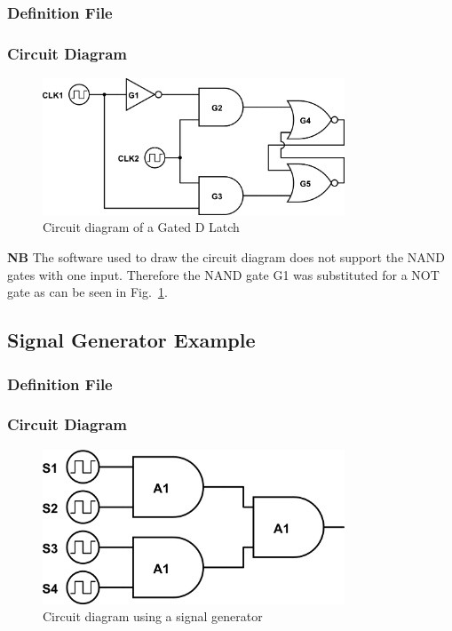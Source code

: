 \documentclass[a4paper,10pt]{article}
\begin{document}
\subsubsection{Definition File}


\subsubsection{Circuit Diagram}
\begin{figure}[h]
 \centering
 \includegraphics[width=9cm]{../../examples/gated-d-latch.png}
 \caption{Circuit diagram of a Gated D Latch}
 \label{fig:example-dlatch}
\end{figure}

\textbf{NB} The software used to draw the circuit diagram does not support the NAND gates with one input. Therefore the NAND gate G1 was substituted for a NOT gate as can be seen in Fig.~\ref{fig:example-dlatch}.

\subsection{Signal Generator Example}

\subsubsection{Definition File}


\subsubsection{Circuit Diagram}
\begin{figure}[h]
 \centering
 \includegraphics[width=9cm]{../../examples/siggen.png}
 \caption{Circuit diagram using a signal generator}
 \label{fig:example-siggen}
\end{figure}
\end{document}

